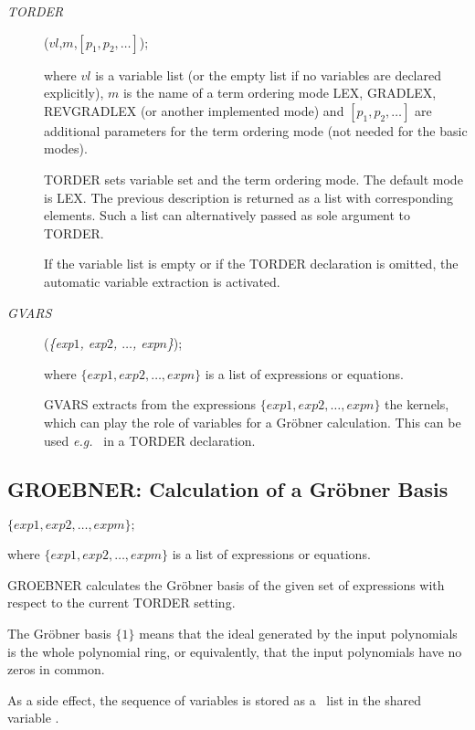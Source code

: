 \begin{description}
\item [{\it TORDER}]($vl$,$m$,$[p_1,p_2,\ldots]$);

where $vl$ is a variable list (or the empty list if
no variables are declared explicitly),
$m$ is the name of a term ordering mode LEX, GRADLEX,
REV\-GRAD\-LEX (or another implemented mode) and
$[p_1,p_2,\ldots]$ are additional parameters for the
term ordering mode (not needed for the basic modes).

TORDER sets variable set and the term ordering mode.
The default mode is LEX.  The previous description is returned
as a list with corresponding elements.  Such a list can
alternatively passed as sole argument to TORDER.

If the variable list is empty or if the TORDER declaration
is omitted, the automatic variable extraction is activated.

\item[{\it GVARS}] ({\it\{exp$1$, exp$2$, $ \ldots$, exp$n$\}});

 where $\{exp1, exp2, \ldots , expn\}$ is a list of expressions or
equations.

GVARS extracts from the expressions $\{exp1, exp2, \ldots , expn\}$
the kernels, which can play the role of variables for a Gr\"obner
calculation.  This can be used {\em e.g.\ } in a TORDER declaration.
\end{description}

\subsection{GROEBNER: Calculation of a Gr\"obner Basis}
\begin{description}
\item[{\it GROEBNER}] $\{exp1, exp2, \ldots , expm\}; $

where $\{exp1, exp2, \ldots , expm\}$ is a list of
expressions or equations.

GROEBNER calculates the Gr\"obner basis of the given set of
expressions with respect to the current TORDER setting.

The Gr\"obner basis $\{1\}$ means that the ideal generated by the
input polynomials is the whole polynomial ring, or equivalently, that
the input polynomials have no zeros in common.

As a side effect, the sequence of variables is stored as a \REDUCE\ list
in the shared variable .
\end{description}

